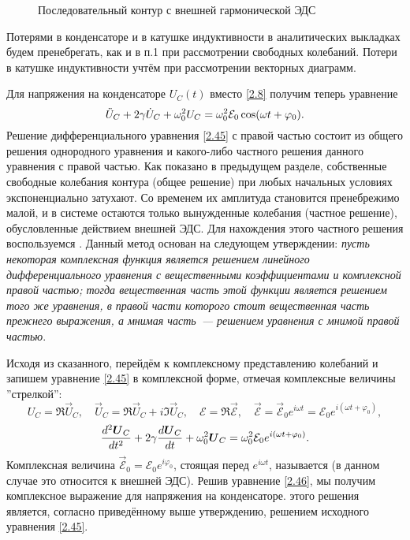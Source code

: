 \documentclass[a4paper,oneside]{book}
\begin{document}
\begin{figure}[h!]
	\centering
	\caption{Последовательный контур с внешней гармонической ЭДС}
\end{figure}

Потерями в конденсаторе и в катушке индуктивности в аналитических выкладках
будем пренебрегать, как и в п.1 при рассмотрении свободных колебаний. Потери в
катушке индуктивности учтём при рассмотрении векторных диаграмм.

Для напряжения на конденсаторе $U_C(t)$ вместо \eqref{2.8} получим теперь
уравнение
\begin{equation}\eqmark{2.45}
\ddot{U}_C+2\gamma \dot{U}_C+\omega_0^2U_C=\omega_0^2\mathcal{E}_0\cos(\omega t+
\varphi_0).
\end{equation}
Решение  дифференциального уравнения \eqref{2.45} с правой
частью состоит из общего решения однородного уравнения и какого-либо частного
решения данного уравнения с правой частью. Как показано в предыдущем разделе,
собственные свободные колебания контура (общее решение) при любых начальных
условиях экспоненциально затухают. Со временем их амплитуда становится
пренебрежимо малой, и в системе остаются только вынужденные колебания (частное
решение), обусловленные действием внешней ЭДС. Для нахождения этого частного
решения воспользуемся . Данный метод
основан на следующем утверждении: \emph{пусть некоторая комплексная функция
является решением линейного дифференциального уравнения с вещественными
коэффициентами и комплексной правой частью; тогда вещественная часть этой
функции является решением того же уравнения, в правой части которого стоит
вещественная часть прежнего выражения, а мнимая часть~--- решением уравнения с
мнимой правой частью}.

Исходя из сказанного, перейдём к комплексному представлению колебаний и запишем
уравнение \eqref{2.45} в комплексной форме, отмечая комплексные величины
''стрелкой'':
\begin{equation*}
U_C=\Re \vec U_C, \quad \vec U_C=\Re \vec U_C+i\Im \vec U_C, \quad
\mathcal{E}=\Re \vec{\mathcal{E}}, \quad \vec{\mathcal{E}}=
\vec{\mathcal{E}}_0e^{i\omega t}=\mathcal{E}_0e^{i(\omega t+\varphi_0)},
\end{equation*}
\begin{equation}\eqmark{2.46}
\dfrac{d^2\vec U_C}{dt^2}+2\gamma\dfrac{d\vec U_C}{dt}+\omega_0^2\vec
U_C=\omega_0^2\mathcal{E}_0e^{i(\omega t+\varphi_0)}.
\end{equation}
Комплексная величина $\vec{\mathcal{E}}_0=\mathcal{E}_0e^{i\varphi_0}$, стоящая
перед $e^{i\omega t}$, называется  (в данном
случае это относится к внешней ЭДС). Решив уравнение \eqref{2.46}, мы получим
комплексное выражение для напряжения на конденсаторе.  этого решения является, согласно приведённому выше утверждению, решением
исходного уравнения \eqref{2.45}.
\end{document}
